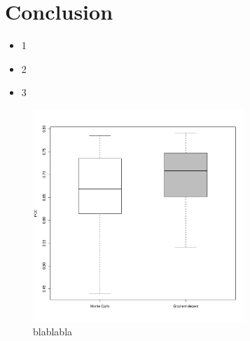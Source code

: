 \documentclass[presentation]{beamer}   %
\begin{document}
\section{Conclusion}
\begin{frame}
\begin{itemize}
\item 1 \pause
\item 2 \pause
\item 3
\end{itemize}
\end{frame}
\begin{frame}[plain]
	\begin{figure}
	\centering
	\includegraphics[width=80mm,height=80mm]{fig/boxplot.pdf}
	\caption{blablabla}
	\end{figure}
\end{frame}
\end{document}
